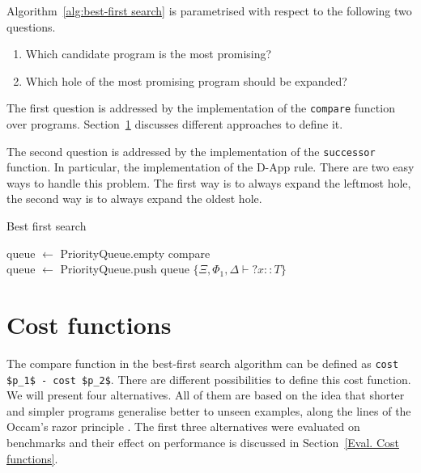 Algorithm~\ref{alg:best-first search} is parametrised with respect to the following two questions.
\begin{enumerate}
\item Which candidate program is the most promising?
\item Which hole of the most promising program should be expanded?
\end{enumerate}
The first question is addressed by the implementation of the \lstinline?compare? function over programs. Section~\ref{Cost functions} discusses different approaches to define it.

The second question is addressed by the implementation of the \lstinline?successor? function. In particular, the implementation of the D-App rule. There are two easy ways to handle this problem. The first way is to always expand the leftmost hole, the second way is to always expand the oldest hole.

\begin{algorithm}
\caption{Best first search\label{alg:best-first search}}

queue $\gets$ PriorityQueue.empty {\color{blue}compare}\\
queue $\gets$ PriorityQueue.push queue $\{\Xi, \Phi_1, \Delta \vdash {?x} :: T\}$\\

\end{algorithm}

\section{Cost functions}\label{Cost functions}
The compare function in the best-first search algorithm can be defined as \lstinline?cost $p_1$ - cost $p_2$?. There are different possibilities to define this cost function. We will present four alternatives. All of them are based on the idea that shorter and simpler programs generalise better to unseen examples, along the lines of the Occam's razor principle \cite{computationalLearningTheory}. The first three alternatives were evaluated on benchmarks and their effect on performance is discussed in Section~\ref{Eval. Cost functions}.

